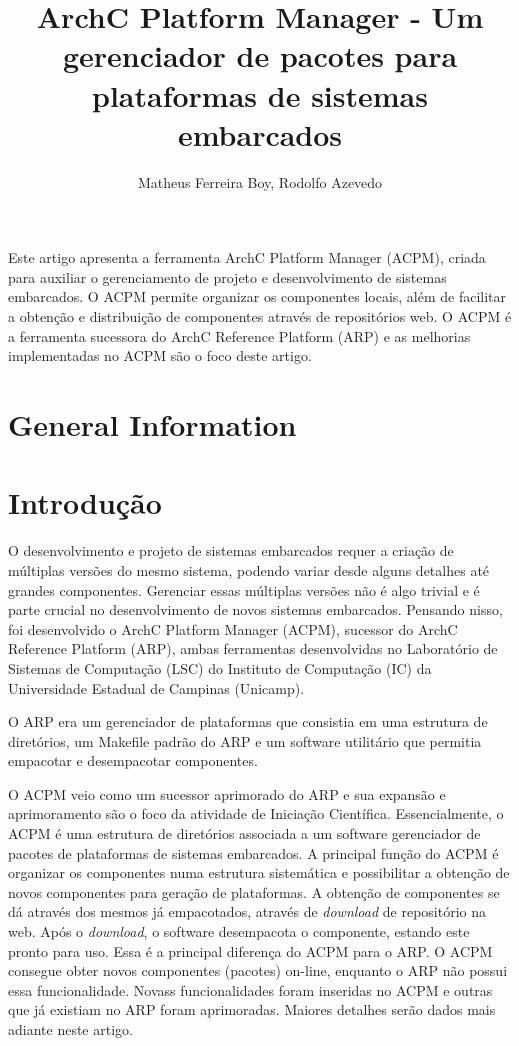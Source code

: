 \documentclass[12pt]{article}
\title{ArchC Platform Manager - Um gerenciador de pacotes para plataformas de
sistemas embarcados}
\author{Matheus Ferreira Boy\inst{1}, Rodolfo Azevedo\inst{1} }
\begin{document}
 

\maketitle

\begin{abstract}
\end{abstract}
     
\begin{resumo} 
Este artigo apresenta a ferramenta ArchC Platform Manager (ACPM), criada para
auxiliar o gerenciamento de projeto e desenvolvimento de sistemas embarcados. O
ACPM permite organizar os componentes locais, além de facilitar a obtenção e distribuição de
componentes através de repositórios web. O ACPM é a ferramenta sucessora
do ArchC Reference Platform (ARP) e as melhorias implementadas no ACPM são o
foco deste artigo.

\end{resumo}


\section{General Information}




\section{Introdução}

O desenvolvimento e projeto de sistemas embarcados requer a criação de múltiplas
versões do mesmo sistema, podendo variar desde alguns detalhes até grandes
componentes. Gerenciar essas múltiplas versões não é algo trivial e é parte
crucial no desenvolvimento de novos sistemas embarcados. Pensando nisso, foi
desenvolvido o ArchC Platform Manager (ACPM), sucessor do ArchC Reference
Platform (ARP), ambas ferramentas desenvolvidas no Laboratório de Sistemas de
Computação (LSC) do Instituto de Computação (IC) da Universidade Estadual de
Campinas (Unicamp).

O ARP era um gerenciador de plataformas que consistia em uma estrutura de
diretórios, um Makefile padrão do ARP e um software utilitário que permitia
empacotar e desempacotar componentes.

O ACPM veio como um sucessor aprimorado do ARP e sua expansão e aprimoramento 
são o foco da atividade de Iniciação Científica. Essencialmente, o ACPM é uma
estrutura de diretórios associada a um software gerenciador de pacotes de
plataformas de sistemas embarcados. A principal função do ACPM é organizar os
componentes numa estrutura sistemática e possibilitar a obtenção de novos
componentes para geração de plataformas. A obtenção de componentes se dá através
dos mesmos já empacotados, através de \textit{download} de repositório na web. Após o
\textit{download}, o software desempacota o componente, estando este pronto para uso.
Essa é a principal diferença do ACPM para o ARP. O ACPM consegue obter novos
componentes (pacotes) on-line, enquanto o ARP não possui essa funcionalidade.
Novass funcionalidades foram inseridas no ACPM e outras que já existiam no ARP
foram aprimoradas. Maiores detalhes serão dados mais adiante neste artigo.
\end{document}
